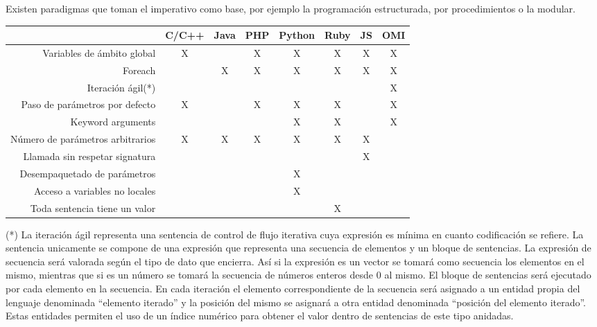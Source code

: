 Existen paradigmas que toman el imperativo como base, por ejemplo la programación
estructurada, por procedimientos o la modular. 


\FloatBarrier
\begin{table}[h]
\begin{center}
 
\begin{tabular}{|r|c|c|c|c|c|c|c|} \hline
 & C/C++ & Java &  PHP  & Python & Ruby & JS & OMI\\ \hline
Variables de ámbito global  & X &  & X & X & X & X & X \\ \hline
Foreach & & X & X & X & X & X & X \\ \hline
Iteración ágil(*) & &  & &  &  &  & X \\ \hline
Paso de parámetros por defecto & X &  & X & X & X & & X  \\ \hline
Keyword arguments & & &  & X & X & & X  \\ \hline
Número de parámetros arbitrarios & X & X & X & X & X & X &   \\ \hline
Llamada sin respetar signatura  &  &  &  &  &  & X &   \\ \hline
Desempaquetado de parámetros & & & & X & & &  \\ \hline
Acceso a variables no locales & & & & X & & &  \\ \hline
Toda sentencia tiene un valor & & & & & X & &  \\ \hline
\end{tabular}
\end{center}
\end{table}
\FloatBarrier

(*) La iteración ágil representa una sentencia de control de flujo iterativa 
cuya expresión es mínima en cuanto codificación se refiere. La 
sentencia unicamente se compone de una expresión que representa una secuencia de elementos
y un bloque de sentencias. La expresión de secuencia será valorada según el tipo de dato
que encierra. Así si la expresión es un vector se tomará como 
secuencia los elementos en el mismo, mientras que si es un número se 
tomará la secuencia de números enteros desde 0 al mismo. El bloque de 
sentencias será ejecutado por cada elemento en la secuencia. En cada iteración 
el elemento correspondiente de la secuencia será asignado a un entidad propia del 
lenguaje denominada ``elemento iterado'' y la posición del mismo se asignará a 
otra entidad denominada ``posición del elemento iterado''. Estas entidades permiten el uso 
de un índice numérico para obtener el valor dentro de sentencias de este tipo anidadas. 

